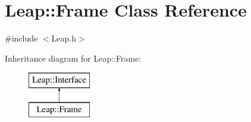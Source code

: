 \hypertarget{class_leap_1_1_frame}{\section{Leap\+:\+:Frame Class Reference}
\label{class_leap_1_1_frame}
}


{\ttfamily \#include $<$Leap.\+h$>$}

Inheritance diagram for Leap\+:\+:Frame\+:\begin{figure}[H]
\begin{center}
\leavevmode
\includegraphics[height=2.000000cm]{class_leap_1_1_frame}
\end{center}
\end{figure}
